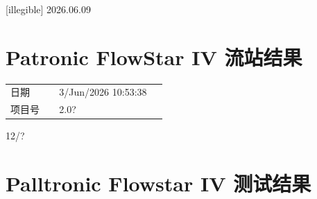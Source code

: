 \documentclass[UTF8,10pt,a4paper,fontset=fandol]{ctexart}
\newcommand{\fieldvalue}[1]{#1}
\newcommand{\handwritten}[1]{#1}
\begin{document}
\handwritten{[illegible] 2026.06.09}

\section{Patronic FlowStar IV 流站结果}

\begin{tabular}{@{}p{0.28\linewidth}p{0.62\linewidth}@{}}
日期 &
\fieldvalue{3/Jun/2026 10:53:38}
\\
项目号 &
\fieldvalue{2.0?}
\end{tabular}

\begin{figure}[h]
\centering
\end{figure}

\handwritten{12/?}

\newpage

\section*{Palltronic Flowstar IV 测试结果}
\end{document}

